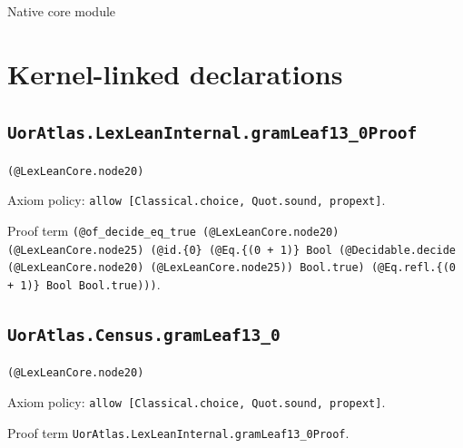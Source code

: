 \documentclass[11pt]{article}
\begin{document}
\begin{center}{\LARGE Native core module}\end{center}
\section*{Kernel-linked declarations}
\subsection*{\texttt{UorAtlas.LexLeanInternal.gramLeaf13\_0Proof}}
\noindent\texttt{(@LexLeanCore.node20)}\par
\noindent Axiom policy: \texttt{allow [Classical.choice, Quot.sound, propext]}.\par
\noindent Proof term \texttt{(@of\_decide\_eq\_true (@LexLeanCore.node20) (@LexLeanCore.node25) (@id.\{0\} (@Eq.\{(0 + 1)\} Bool (@Decidable.decide (@LexLeanCore.node20) (@LexLeanCore.node25)) Bool.true) (@Eq.refl.\{(0 + 1)\} Bool Bool.true)))}.\par
\subsection*{\texttt{UorAtlas.Census.gramLeaf13\_0}}
\noindent\texttt{(@LexLeanCore.node20)}\par
\noindent Axiom policy: \texttt{allow [Classical.choice, Quot.sound, propext]}.\par
\noindent Proof term \texttt{UorAtlas.LexLeanInternal.gramLeaf13\_0Proof}.\par
\end{document}
